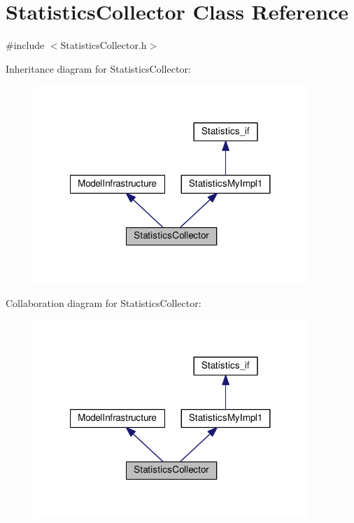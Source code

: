 \hypertarget{class_statistics_collector}{\section{Statistics\-Collector Class Reference}
\label{class_statistics_collector}
}


{\ttfamily \#include $<$Statistics\-Collector.\-h$>$}



Inheritance diagram for Statistics\-Collector\-:
\nopagebreak
\begin{figure}[H]
\begin{center}
\leavevmode
\includegraphics[width=293pt]{class_statistics_collector__inherit__graph}
\end{center}
\end{figure}


Collaboration diagram for Statistics\-Collector\-:
\nopagebreak
\begin{figure}[H]
\begin{center}
\leavevmode
\includegraphics[width=293pt]{class_statistics_collector__coll__graph}
\end{center}
\end{figure}

